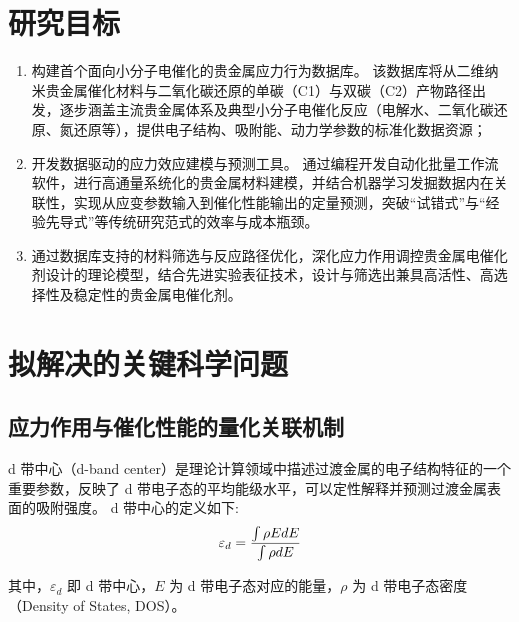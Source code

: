 \section{研究目标}

\begin{enumerate}
	\item
	      构建首个面向小分子电催化的贵金属应力行为数据库。
	      该数据库将从二维纳米贵金属催化材料与二氧化碳还原的单碳（C1）与双碳（C2）产物路径出发，逐步涵盖主流贵金属体系及典型小分子电催化反应（电解水、二氧化碳还原、氮还原等），提供电子结构、吸附能、动力学参数的标准化数据资源；

	\item
	      开发数据驱动的应力效应建模与预测工具。
	      通过编程开发自动化批量工作流软件，进行高通量系统化的贵金属材料建模，并结合机器学习发掘数据内在关联性，实现从应变参数输入到催化性能输出的定量预测，突破``试错式''与``经验先导式''等传统研究范式的效率与成本瓶颈。

	\item
	      通过数据库支持的材料筛选与反应路径优化，深化应力作用调控贵金属电催化剂设计的理论模型，结合先进实验表征技术，设计与筛选出兼具高活性、高选择性及稳定性的贵金属电催化剂。
\end{enumerate}
\section{拟解决的关键科学问题}
\subsection{应力作用与催化性能的量化关联机制}

d 带中心（d-band center）是理论计算领域中描述过渡金属的电子结构特征的一个重要参数，反映了 d 带电子态的平均能级水平，可以定性解释并预测过渡金属表面的吸附强度。
d 带中心的定义如下:
$$
\setlength{\abovedisplayskip}{12pt}
\setlength{\belowdisplayskip}{12pt}
	\varepsilon_d = \frac{\int \rho EdE}{\int \rho dE}
$$

其中，$\varepsilon_{d}$ 即 d 带中心，$E$ 为 d
带电子态对应的能量，$\rho$ 为 d 带电子态密度（Density of States, DOS）。

